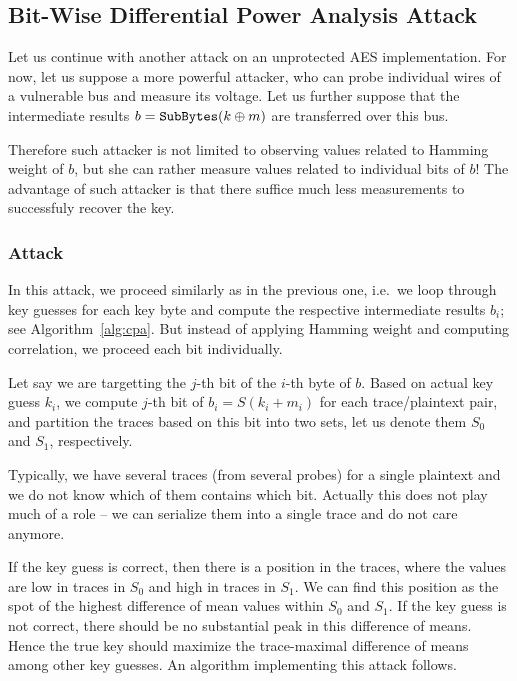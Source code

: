 
\subsection{Bit-Wise Differential Power Analysis Attack}

Let us continue with another attack on an unprotected AES implementation. For now, let us suppose a more powerful attacker, who can probe individual wires of a vulnerable bus and measure its voltage. Let us further suppose that the intermediate results $b = \texttt{SubBytes}(k\oplus m)$ are transferred over this bus.

Therefore such attacker is not limited to observing values related to Hamming weight of $b$, but she can rather measure values related to individual bits of $b$! The advantage of such attacker is that there suffice much less measurements to successfuly recover the key.

\subsubsection{Attack}
	
	In this attack, we proceed similarly as in the previous one, i.e.\ we loop through key guesses for each key byte and compute the respective intermediate results $b_i$; see Algorithm~\ref{alg:cpa}. But instead of applying Hamming weight and computing correlation, we proceed each bit individually.
	
	Let say we are targetting the $j$-th bit of the $i$-th byte of $b$. Based on actual key guess $k_i$, we compute $j$-th bit of $b_i = S(k_i+m_i)$ for each trace/plaintext pair, and partition the traces based on this bit into two sets, let us denote them $S_0$ and $S_1$, respectively.
	
	\begin{note}
	\label{note:concattraces}
		Typically, we have several traces (from several probes) for a single plaintext and we do not know which of them contains which bit. Actually this does not play much of a role -- we can serialize them into a single trace and do not care anymore.
	\end{note}
	
	If the key guess is correct, then there is a position in the traces, where the values are low in traces in $S_0$ and high in traces in $S_1$. We can find this position as the spot of the highest difference of mean values within $S_0$ and $S_1$. If the key guess is not correct, there should be no substantial peak in this difference of means. Hence the true key should maximize the trace-maximal difference of means among other key guesses. An algorithm implementing this attack follows.
	
